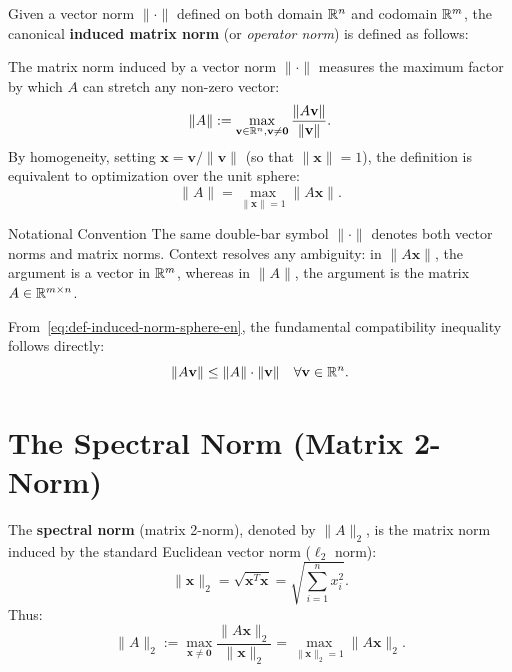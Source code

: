 Given a vector norm $\|\cdot\|$ defined on both domain $\mathbb{R}^n$ and codomain $\mathbb{R}^m$, the canonical \textbf{induced matrix norm} (or \textit{operator norm}) is defined as follows:

\begin{definition}
The matrix norm induced by a vector norm $\|\cdot\|$ measures the maximum factor by which $A$ can stretch any non-zero vector:
\begin{equation}
    \|A\| := \max_{\mathbf{v} \in \mathbb{R}^n, \mathbf{v} \neq \mathbf{0}} \frac{\|A\mathbf{v}\|}{\|\mathbf{v}\|}.
\end{equation}
By homogeneity, setting $\mathbf{x} = \mathbf{v} / \|\mathbf{v}\|$ (so that $\|\mathbf{x}\| = 1$), the definition is equivalent to optimization over the unit sphere:
\begin{equation}
    \label{eq:def-induced-norm-sphere-en}
    \|A\| = \max_{\|\mathbf{x}\| = 1} \|A\mathbf{x}\|.
\end{equation}
\end{definition}

\begin{noteblock}{Notational Convention}
The same double-bar symbol $\|\cdot\|$ denotes both vector norms and matrix norms. Context resolves any ambiguity: in $\|A\mathbf{x}\|$, the argument is a vector in $\mathbb{R}^m$, whereas in $\|A\|$, the argument is the matrix $A \in \mathbb{R}^{m \times n}$.
\end{noteblock}

From~\eqref{eq:def-induced-norm-sphere-en}, the fundamental compatibility inequality follows directly:
\begin{equation}
    \|A\mathbf{v}\| \le \|A\| \cdot \|\mathbf{v}\| \quad \forall \mathbf{v} \in \mathbb{R}^n.
\end{equation}

\FloatBarrier
\section{The Spectral Norm (Matrix 2-Norm)}
\label{sec:spectral-norm-en}

The \textbf{spectral norm} (matrix 2-norm), denoted by $\|A\|_2$, is the matrix norm induced by the standard Euclidean vector norm ($\ell_2$ norm):
\begin{equation}
    \|\mathbf{x}\|_2 = \sqrt{\mathbf{x}^T \mathbf{x}} = \sqrt{\sum_{i=1}^n x_i^2}.
\end{equation}
Thus:
\begin{equation}
    \|A\|_2 := \max_{\mathbf{x} \neq \mathbf{0}} \frac{\|A\mathbf{x}\|_2}{\|\mathbf{x}\|_2} = \max_{\|\mathbf{x}\|_2 = 1} \|A\mathbf{x}\|_2.
\end{equation}

